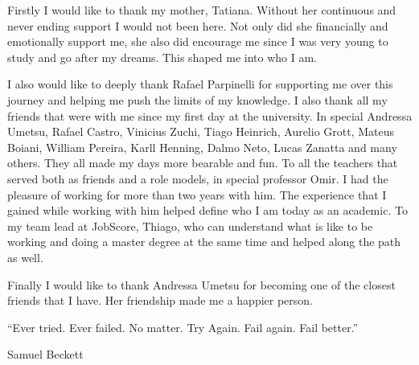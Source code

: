 \begin{agradecimentos}
  Firstly I would like to thank my mother, Tatiana. Without her continuous and never ending support
  I would not been here. Not only did she financially and emotionally support me, she also
  did encourage me since I was very young to study and go after my dreams. This shaped me
  into who I am.

  I also would like to deeply thank Rafael Parpinelli for supporting me over this journey
  and helping me push the limits of my knowledge. I also thank all my friends that were with
  me since my first day at the university. In special Andressa Umetsu, Rafael Castro, Vinicius Zuchi,
  Tiago Heinrich,
  Aurelio Grott, Mateus Boiani, William Pereira, Karll Henning, Dalmo Neto, Lucas Zanatta and many others.
  They all made my days more bearable and fun.
  To all the teachers that served both as friends and a role models,
  in special professor Omir. I had the pleasure of working for more than two years with him.
  The experience that I gained while working with him helped define who I am today as an academic.
  To my team lead at JobScore, Thiago, who can understand what is like to be working and doing a master
  degree at the same time and helped along the path as well.

  Finally I would like to thank Andressa Umetsu for becoming one of the closest friends that
  I have. Her friendship made me a happier person.
\end{agradecimentos}

\begin{epigrafe}
  ``Ever tried. Ever failed. No matter. Try Again. Fail again. Fail better.''
  \\
  \par
  Samuel Beckett
\end{epigrafe}




